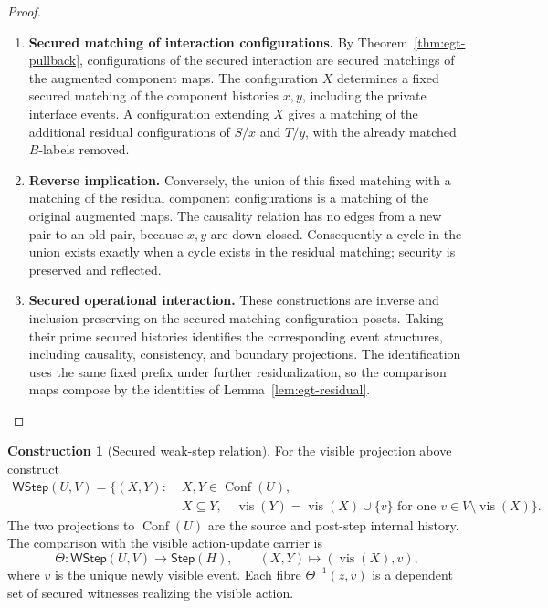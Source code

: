 \documentclass[11pt,a4paper]{article}
\numberwithin{equation}{section}
\theoremstyle{definition}
\newtheorem{construction}[construction]{Construction}
\theoremstyle{remark}
\theoremstyle{plain}
\begin{document}
\begin{proof}
\leavevmode
\begin{enumerate}[label=\textup{(\arabic*)},leftmargin=*,itemsep=4pt,topsep=3pt]
  \item \textbf{Secured matching of interaction configurations.} By Theorem~\ref{thm:egt-pullback}, configurations of the secured
interaction are secured matchings of the augmented component maps. The configuration $X$ determines a fixed secured matching of the
component histories $x,y$, including the private interface events. A configuration extending $X$ gives a matching of the additional
residual configurations of $S/x$ and $T/y$, with the already matched
$B$-labels removed.
  \item \textbf{Reverse implication.} Conversely, the union of this fixed matching
with a matching of the residual component configurations is a matching
of the original augmented maps. The causality relation has no edges
from a new pair to an old pair, because $x,y$ are down-closed. Consequently a cycle in the union exists exactly when a cycle exists
in the residual matching; security is preserved and reflected.
  \item \textbf{Secured operational interaction.} These constructions are inverse and inclusion-preserving on the
secured-matching configuration posets. Taking their prime secured
histories identifies the corresponding event structures, including
causality, consistency, and boundary projections. The identification
uses the same fixed prefix under further residualization, so the
comparison maps compose by the identities of
Lemma~\ref{lem:egt-residual}.
\end{enumerate}
\end{proof}


\begin{construction}[Secured weak-step relation]
\label{con:egt-secured-weak-steps}
For the visible projection above construct
\[
 \begin{aligned}
 \mathsf{WStep}(U,V)=\{(X,Y):\;&X,Y\in\operatorname{Conf}(U),\\
 &X\subseteq Y,\quad
 \operatorname{vis}(Y)=\operatorname{vis}(X)\cup\{v\}
 \text{ for one }v\in V\setminus\operatorname{vis}(X)\}.
 \end{aligned}
\]
The two projections to $\operatorname{Conf}(U)$ are the source and
post-step internal history. The comparison with the visible action-update
carrier is
\begin{equation}\label{eq:egt-secured-weak-comparison}
 \Theta:\mathsf{WStep}(U,V)\to\mathsf{Step}(H),\qquad
 (X,Y)\longmapsto(\operatorname{vis}(X),v),
\end{equation}
where $v$ is the unique newly visible event. Each fibre $\Theta^{-1}(z,v)$
is a dependent set of secured witnesses realizing the visible action.
\end{construction}
\end{document}
